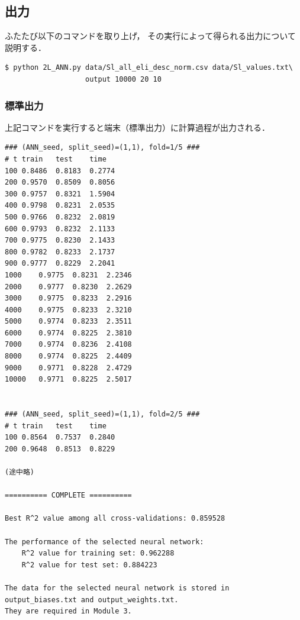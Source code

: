 \documentclass[11pt, titlepage, dvipdfmx, twoside]{jarticle}
\begin{document}
\subsection{出力}
ふたたび以下のコマンドを取り上げ，
その実行によって得られる出力について説明する．
\begin{oframed}
{\small
\begin{verbatim}
$ python 2L_ANN.py data/Sl_all_eli_desc_norm.csv data/Sl_values.txt\
                   output 10000 20 10
\end{verbatim}
}
\end{oframed}


\subsubsection{標準出力}
上記コマンドを実行すると端末（標準出力）に計算過程が出力される．
\begin{oframed}
  {\small
\begin{verbatim}
### (ANN_seed, split_seed)=(1,1), fold=1/5 ###
# t	train	test	time
100	0.8486	0.8183	0.2774
200	0.9570	0.8509	0.8056
300	0.9757	0.8321	1.5904
400	0.9798	0.8231	2.0535
500	0.9766	0.8232	2.0819
600	0.9793	0.8232	2.1133
700	0.9775	0.8230	2.1433
800	0.9782	0.8233	2.1737
900	0.9777	0.8229	2.2041
1000	0.9775	0.8231	2.2346
2000	0.9777	0.8230	2.2629
3000	0.9775	0.8233	2.2916
4000	0.9775	0.8233	2.3210
5000	0.9774	0.8233	2.3511
6000	0.9774	0.8225	2.3810
7000	0.9774	0.8236	2.4108
8000	0.9774	0.8225	2.4409
9000	0.9771	0.8228	2.4729
10000	0.9771	0.8225	2.5017


### (ANN_seed, split_seed)=(1,1), fold=2/5 ###
# t	train	test	time
100	0.8564	0.7537	0.2840
200	0.9648	0.8513	0.8229

(途中略)

========== COMPLETE ==========

Best R^2 value among all cross-validations:	0.859528

The performance of the selected neural network:
	R^2 value for training set:	0.962288
	R^2 value for test set:	0.884223

The data for the selected neural network is stored in
output_biases.txt and output_weights.txt.
They are required in Module 3.
\end{verbatim}        
}
\end{oframed}
\end{document}
